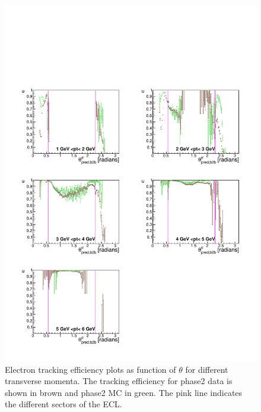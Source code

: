 \documentclass[a4paper,11pt,twosided,final,german,openbib,pdftex,listof=totoc,bibliography=totoc]{scrbook}
\begin{document}
\begin{figure}[!htbp]
	\centering
	\includegraphics[width=\textwidth]{Plots/master/xPtMThetaem}
	\caption[Transverse Momentum $\theta$ Electron Efficiency Phase2]{Electron tracking efficiency plots as function of $\theta$ for different transverse momenta. The tracking efficiency for phase2 data is shown in brown and phase2 MC in green. The pink line indicates the different sectors of the ECL.}
	\label{plt:xPtMThetaem}
\end{figure}
\end{document}
